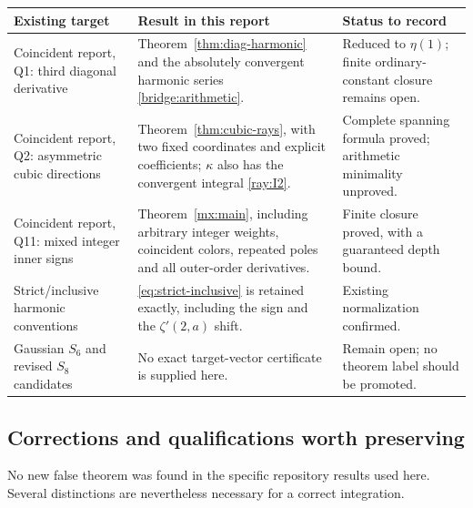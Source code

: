 \documentclass[11pt]{article}
\numberwithin{equation}{section}
\theoremstyle{definition}
\theoremstyle{remark}
\begin{document}
\begin{longtable}{@{}>{\raggedright\arraybackslash}p{}>{\raggedright\arraybackslash}p{}>{\raggedright\arraybackslash}p{}@{}}
\toprule
Existing target & Result in this report & Status to record\\
\midrule
\endhead
Coincident report, Q1: third diagonal derivative
& Theorem~\ref{thm:diag-harmonic} and the absolutely convergent
harmonic series \eqref{bridge:arithmetic}.
& Reduced to $\eta(1)$; finite ordinary-constant closure remains open.\\[5pt]
Coincident report, Q2: asymmetric cubic directions
& Theorem~\ref{thm:cubic-rays}, with two fixed coordinates and
explicit coefficients; $\kappa$ also has the convergent integral
\eqref{ray:I2}.
& Complete spanning formula proved; arithmetic minimality unproved.\\[5pt]
Coincident report, Q11: mixed integer inner signs
& Theorem~\ref{mx:main}, including arbitrary integer weights,
coincident colors, repeated poles and all outer-order derivatives.
& Finite closure proved, with a guaranteed depth bound.\\[5pt]
Strict/inclusive harmonic conventions
& \eqref{eq:strict-inclusive} is retained exactly, including
the sign and the $\zeta'(2,a)$ shift.
& Existing normalization confirmed.\\[5pt]
Gaussian $S_6$ and revised $S_8$ candidates
& No exact target-vector certificate is supplied here.
& Remain open; no theorem label should be promoted.\\
\bottomrule
\end{longtable}

\subsection{Corrections and qualifications worth preserving}

No new false theorem was found in the specific repository results
used here. Several distinctions are nevertheless necessary for a
correct integration.
\end{document}
